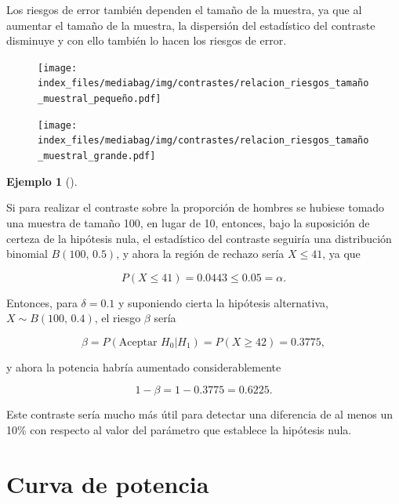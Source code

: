 \documentclass[
  a4paper,
]{scrreport}
\theoremstyle{definition}
\theoremstyle{definition}
\newtheorem{example}{Ejemplo}[chapter]
\theoremstyle{plain}
\theoremstyle{remark}
\begin{document}
Los riesgos de error también dependen el tamaño de la muestra, ya que al
aumentar el tamaño de la muestra, la dispersión del estadístico del
contraste disminuye y con ello también lo hacen los riesgos de error.

\begin{figure}

{\centering \texttt{[image: index\_files/mediabag/img/contrastes/relacion\_riesgos\_tamaño\_muestral\_pequeño.pdf]}

}

\end{figure}

\begin{figure}

{\centering \texttt{[image: index\_files/mediabag/img/contrastes/relacion\_riesgos\_tamaño\_muestral\_grande.pdf]}

}

\end{figure}

\begin{example}[]\protect\hypertarget{exm-relacion-riesgos-tamaño-muestral}{}\label{exm-relacion-riesgos-tamaño-muestral}

Si para realizar el contraste sobre la proporción de hombres se hubiese
tomado una muestra de tamaño 100, en lugar de 10, entonces, bajo la
suposición de certeza de la hipótesis nula, el estadístico del contraste
seguiría una distribución binomial \(B(100,\,0.5)\), y ahora la región
de rechazo sería \(X\leq 41\), ya que

\[P(X\leq 41) = 0.0443 \leq 0.05 =\alpha.\]

Entonces, para \(\delta=0.1\) y suponiendo cierta la hipótesis
alternativa, \(X\sim B(100,\,0.4)\), el riesgo \(\beta\) sería

\[\beta = P(\mbox{Aceptar }H_0|H_1) = P(X\geq 42) = 0.3775,\]

y ahora la potencia habría aumentado considerablemente

\[1-\beta = 1-0.3775 = 0.6225.\]

Este contraste sería mucho más útil para detectar una diferencia de al
menos un 10\% con respecto al valor del parámetro que establece la
hipótesis nula.

\end{example}

\hypertarget{curva-de-potencia}{%
\section{Curva de potencia}\label{curva-de-potencia}}
\end{document}
